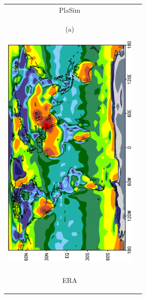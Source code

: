 \documentclass[12pt,a4paper,twoside,openright,headinclude,liststotoc,bibtotoc]{scrreprt}
\begin{document}
\begin{figure}[c]
\begin{tabular}{cc}
\hspace{-0.5cm}PlaSim
\\
\begin{minipage}{1.0\textwidth}
\begin{center}
\begin{scriptsize}(a)\end{scriptsize}\hspace{-1cm}\includegraphics[height=12.0cm,angle=-90]{eps/zonaltmbow.eps} 
\end{center}
\end{minipage}
\\
\\
\begin{minipage}{1.0\textwidth}\hspace{7.9cm}ERA\vspace{-0.6cm}
\begin{center}

\end{center}
\end{minipage}
\end{tabular}
\end{figure}
\end{document}
